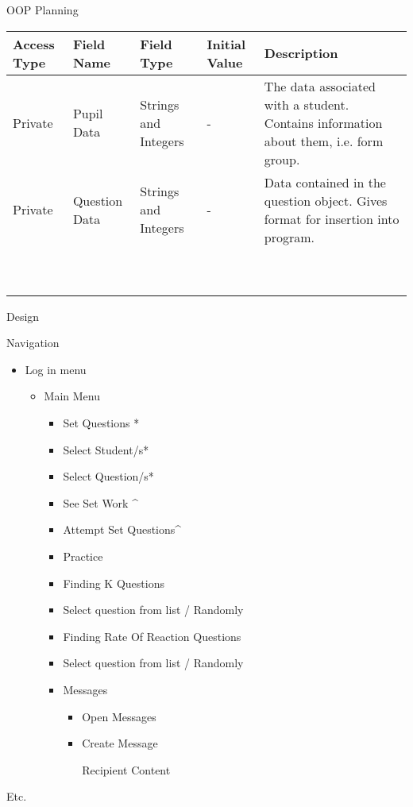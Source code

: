 \documentclass{article}
\begin{document}
\bigskip


\bigskip

OOP Planning

\begin{flushleft}
\tablefirsthead{}
\tablehead{}
\tabletail{}
\tablelasttail{}
\begin{supertabular}{|m{0.81435984in}|m{1.0191599in}|m{0.8469598in}|m{0.9038598in}|m{2.43586in}|}
\hline
Access Type &
Field Name &
Field Type &
Initial Value &
Description\\\hline
Private &
Pupil Data &
Strings and Integers &
{}- &
The data associated with a student. Contains information about them, i.e. form group.\\\hline
Private &
Question Data &
Strings and Integers &
{}- &
Data contained in the question object. Gives format for insertion into program.\\\hline
~
 &
~
 &
~
 &
~
 &
~
\\\hline
~
 &
~
 &
~
 &
~
 &
~
\\\hline
\end{supertabular}
\end{flushleft}

\bigskip


\bigskip

Design


\bigskip

Navigation


\bigskip

\begin{itemize}
\item Log in menu

\begin{itemize}
\item Main Menu

\begin{itemize}
\item Set Questions *
\item Select Student/s*
\item Select Question/s*
\item See Set Work \^{}
\item Attempt Set Questions\^{}
\item Practice
\item Finding K Questions
\item Select question from list / Randomly
\item Finding Rate Of Reaction Questions
\item Select question from list / Randomly
\item Messages

\begin{itemize}
\item Open Messages
\item Create Message

Recipient
Content
\end{itemize}
\end{itemize}
\end{itemize}
\end{itemize}
Etc.
\end{document}
